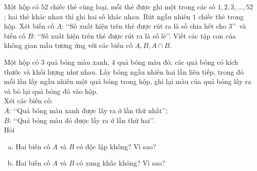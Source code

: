 \begin{vd}%
	Một hộp có $52$ chiếc thẻ cùng loại, mỗi thẻ được ghi một trong các số $1,2,3, \ldots, 52$; hai thẻ khác nhau thì ghi hai số khác nhau. Rút ngẫu nhiên $1$ chiếc thẻ trong hộp. Xét biến cố $A$: \lq\lq Số xuất hiện trên thẻ được rút ra là số chia hết cho 3\rq\rq \, và biến cố $B$: \lq\lq Số xuất hiện trên thẻ được rút ra là số lẻ\rq\rq. Viết các tập con của không gian mẫu tương ứng với các biến cố $A, B, A \cap B$.
\end{vd}

\begin{vd}%
	Một hộp có $3$ quả bóng màu xanh, $4$ quả bóng màu đỏ; các quả bóng có kích thước và khối lượng như nhau. Lấy bóng ngẫu nhiên hai lần liên tiếp, trong đó mỗi lần lấy ngẫu nhiên một quả bóng trong hộp, ghi lại màu của quả bóng lấy ra và bỏ lại quả bóng đó vào hộp.\\
	Xét các biến cố:\\
	$A$: \lq\lq Quả bóng màu xanh được lấy ra ở lần thứ nhất\rq\rq;\\
	$B$: \lq\lq Quả bóng màu đỏ được lấy ra ở lần thứ hai\rq\rq.\\
	Hỏi
	\begin{enumerate}[a)]
		\item Hai biến cố $A$ và $B$ có độc lập không? Vì sao?
		\item Hai biến cố $A$ và $B$ có xung khắc không? Vì sao?
	\end{enumerate}
\end{vd}

